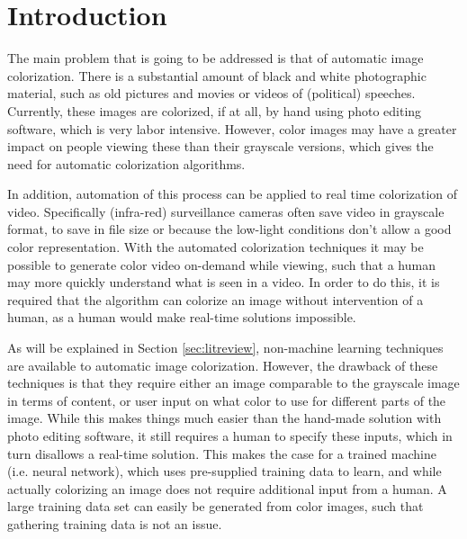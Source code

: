 \section{Introduction}
The main problem that is going to be addressed is that of automatic image colorization. There is a substantial amount of black and white photographic material, such as old pictures and movies or videos of (political) speeches. Currently, these images are colorized, if at all, by hand using photo editing software, which is very labor intensive. However, color images may have a greater impact on people viewing these than their grayscale versions, which gives the need for automatic colorization algorithms.

In addition, automation of this process can be applied to real time colorization of video. Specifically (infra-red) surveillance cameras often save video in grayscale format, to save in file size or because the low-light conditions don't allow a good color representation. With the automated colorization techniques it may be possible to generate color video on-demand while viewing, such that a human may more quickly understand what is seen in a video. In order to do this, it is required that the algorithm can colorize an image without intervention of a human, as a human would make real-time solutions impossible.

As will be explained in Section \ref{sec:litreview}, non-machine learning techniques are available to automatic image colorization. However, the drawback of these techniques is that they require either an image comparable to the grayscale image in terms of content, or user input on what color to use for different parts of the image. While this makes things much easier than the hand-made solution with photo editing software, it still requires a human to specify these inputs, which in turn disallows a real-time solution. This makes the case for a trained machine (i.e. neural network), which uses pre-supplied training data to learn, and while actually colorizing an image does not require additional input from a human. A large training data set can easily be generated from color images, such that gathering training data is not an issue.
